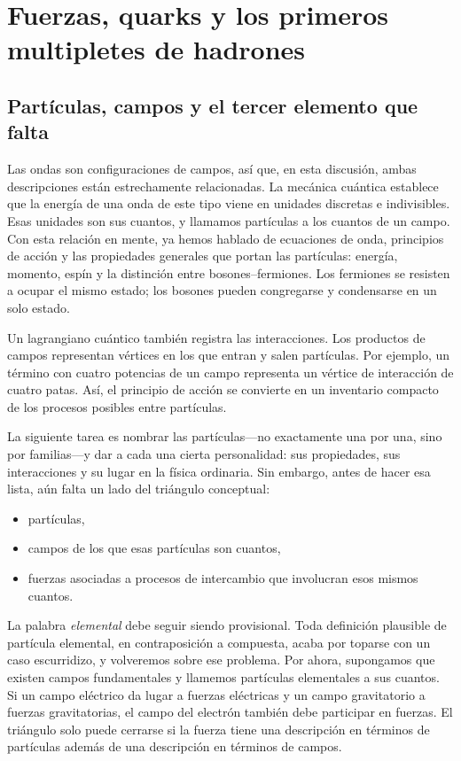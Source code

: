 \chapter{Fuerzas, quarks y los primeros multipletes de hadrones}

\section{Partículas, campos y el tercer elemento que falta}

Las ondas son configuraciones de campos, así que, en esta discusión, ambas descripciones están estrechamente relacionadas. La mecánica cuántica establece que la energía de una onda de este tipo viene en unidades discretas e indivisibles. Esas unidades son sus cuantos, y llamamos partículas a los cuantos de un campo. Con esta relación en mente, ya hemos hablado de ecuaciones de onda, principios de acción y las propiedades generales que portan las partículas: energía, momento, espín y la distinción entre bosones--fermiones. Los fermiones se resisten a ocupar el mismo estado; los bosones pueden congregarse y condensarse en un solo estado.

Un lagrangiano cuántico también registra las interacciones. Los productos de campos representan vértices en los que entran y salen partículas. Por ejemplo, un término con cuatro potencias de un campo representa un vértice de interacción de cuatro patas. Así, el principio de acción se convierte en un inventario compacto de los procesos posibles entre partículas.

La siguiente tarea es nombrar las partículas---no exactamente una por una, sino por familias---y dar a cada una cierta personalidad: sus propiedades, sus interacciones y su lugar en la física ordinaria. Sin embargo, antes de hacer esa lista, aún falta un lado del triángulo conceptual:
\begin{itemize}
\item partículas,
\item campos de los que esas partículas son cuantos,
\item fuerzas asociadas a procesos de intercambio que involucran esos mismos cuantos.
\end{itemize}

La palabra \emph{elemental} debe seguir siendo provisional. Toda definición plausible de partícula elemental, en contraposición a compuesta, acaba por toparse con un caso escurridizo, y volveremos sobre ese problema. Por ahora, supongamos que existen campos fundamentales y llamemos partículas elementales a sus cuantos. Si un campo eléctrico da lugar a fuerzas eléctricas y un campo gravitatorio a fuerzas gravitatorias, el campo del electrón también debe participar en fuerzas. El triángulo solo puede cerrarse si la fuerza tiene una descripción en términos de partículas además de una descripción en términos de campos.

